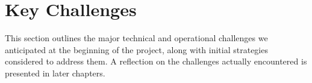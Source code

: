 




\section{Key Challenges}
This section outlines the major technical and operational challenges we anticipated at the beginning of the project, along with initial strategies considered to address them. A reflection on the challenges actually encountered is presented in later chapters.



